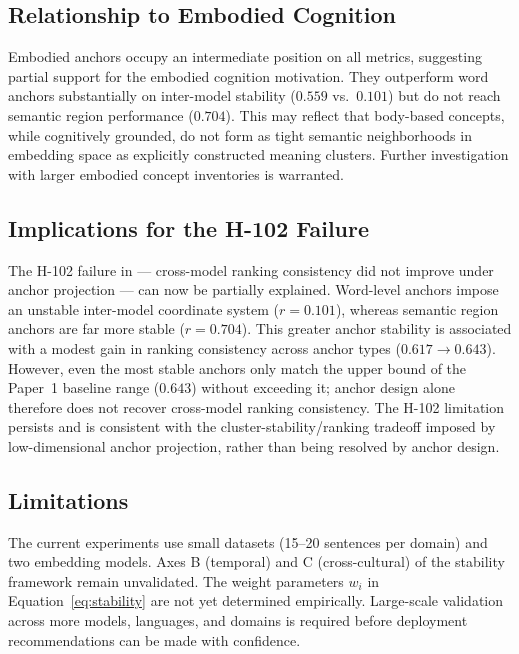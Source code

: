 \documentclass[11pt,a4paper]{article}
\begin{document}
\subsection{Relationship to Embodied Cognition}

Embodied anchors occupy an intermediate position on all metrics,
suggesting partial support for the embodied cognition motivation.
They outperform word anchors substantially on inter-model stability
($0.559$ vs.\ $0.101$) but do not reach semantic region performance
($0.704$). This may reflect that body-based concepts, while cognitively
grounded, do not form as tight semantic neighborhoods in embedding
space as explicitly constructed meaning clusters. Further investigation
with larger embodied concept inventories is warranted.

\subsection{Implications for the H-102 Failure}

The H-102 failure in \cite{saitou2026poc} --- cross-model ranking
consistency did not improve under anchor projection --- can now be
partially explained. Word-level anchors impose an unstable inter-model
coordinate system ($r = 0.101$), whereas semantic region anchors are
far more stable ($r = 0.704$). This greater anchor stability is
associated with a modest gain in ranking consistency across anchor types
($0.617 \to 0.643$). However, even the most stable anchors only match
the upper bound of the Paper~1 baseline range ($0.643$) without
exceeding it; anchor design alone therefore does not recover cross-model
ranking consistency. The H-102 limitation persists and is consistent
with the cluster-stability/ranking tradeoff imposed by low-dimensional
anchor projection, rather than being resolved by anchor design.

\subsection{Limitations}

The current experiments use small datasets (15--20 sentences per domain)
and two embedding models. Axes B (temporal) and C (cross-cultural) of
the stability framework remain unvalidated. The weight parameters $w_i$
in Equation~\ref{eq:stability} are not yet determined empirically.
Large-scale validation across more models, languages, and domains is
required before deployment recommendations can be made with confidence.
\end{document}
